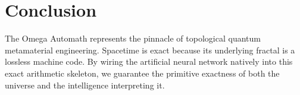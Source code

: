 \documentclass[11pt,a4paper]{article}
\begin{document}
\section{Conclusion}
The Omega Automath represents the pinnacle of topological quantum metamaterial engineering. Spacetime is exact because its underlying fractal is a lossless machine code. By wiring the artificial neural network natively into this exact arithmetic skeleton, we guarantee the primitive exactness of both the universe and the intelligence interpreting it.
\end{document}
